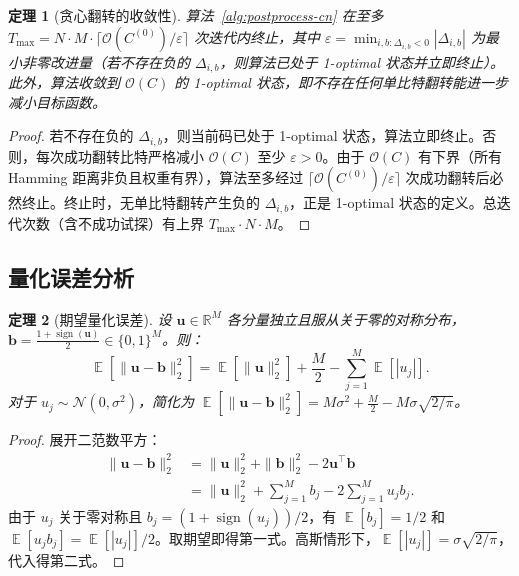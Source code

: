 \documentclass[11pt,a4paper]{article}
\newtheorem{theorem}{定理}
\DeclareMathOperator{\sign}{sign}
\DeclareMathOperator{\E}{\mathbb{E}}
\begin{document}
\begin{theorem}[贪心翻转的收敛性]\label{thm:convergence-cn}
算法~\ref{alg:postprocess-cn} 在至多 $T_{\max} = N \cdot M \cdot \lceil \mathcal{O}(C^{(0)}) / \varepsilon \rceil$ 次迭代内终止，其中 $\varepsilon = \min_{i,b: \Delta_{i,b} < 0} |\Delta_{i,b}|$ 为最小非零改进量（若不存在负的 $\Delta_{i,b}$，则算法已处于 1-optimal 状态并立即终止）。此外，算法收敛到 $\mathcal{O}(C)$ 的 1-optimal 状态，即不存在任何单比特翻转能进一步减小目标函数。
\end{theorem}

\begin{proof}
若不存在负的 $\Delta_{i,b}$，则当前码已处于 1-optimal 状态，算法立即终止。否则，每次成功翻转比特严格减小 $\mathcal{O}(C)$ 至少 $\varepsilon > 0$。由于 $\mathcal{O}(C)$ 有下界（所有 Hamming 距离非负且权重有界），算法至多经过 $\lceil \mathcal{O}(C^{(0)}) / \varepsilon \rceil$ 次成功翻转后必然终止。终止时，无单比特翻转产生负的 $\Delta_{i,b}$，正是 1-optimal 状态的定义。总迭代次数（含不成功试探）有上界 $T_{\max} \cdot N \cdot M$。
\end{proof}

\subsection{量化误差分析}

\begin{theorem}[期望量化误差]\label{thm:quant-error-cn}
设 $\mathbf{u} \in \mathbb{R}^M$ 各分量独立且服从关于零的对称分布，$\mathbf{b} = \frac{1 + \sign(\mathbf{u})}{2} \in \{0,1\}^M$。则：
\begin{equation}
    \E[\|\mathbf{u} - \mathbf{b}\|_2^2] = \E[\|\mathbf{u}\|_2^2] + \frac{M}{2} - \sum_{j=1}^{M} \E[|u_j|].
\end{equation}
对于 $u_j \sim \mathcal{N}(0, \sigma^2)$，简化为 $\E[\|\mathbf{u} - \mathbf{b}\|_2^2] = M\sigma^2 + \frac{M}{2} - M\sigma\sqrt{2/\pi}$。
\end{theorem}

\begin{proof}
展开二范数平方：
\begin{align}
    \|\mathbf{u} - \mathbf{b}\|_2^2 &= \|\mathbf{u}\|_2^2 + \|\mathbf{b}\|_2^2 - 2\mathbf{u}^\top \mathbf{b} \\
    &= \|\mathbf{u}\|_2^2 + \sum_{j=1}^{M} b_j - 2\sum_{j=1}^{M} u_j b_j.
\end{align}
由于 $u_j$ 关于零对称且 $b_j = (1 + \sign(u_j))/2$，有 $\E[b_j] = 1/2$ 和 $\E[u_j b_j] = \E[|u_j|]/2$。取期望即得第一式。高斯情形下，$\E[|u_j|] = \sigma\sqrt{2/\pi}$，代入得第二式。
\end{proof}
\end{document}
